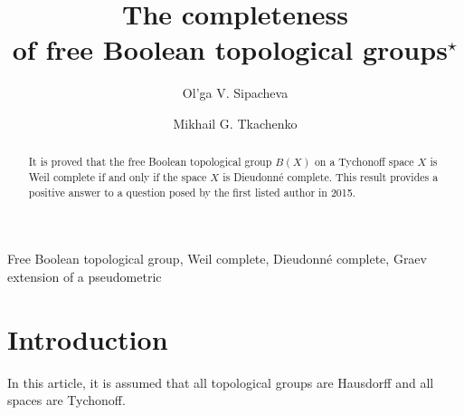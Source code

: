 \documentclass[a4paper,12pt]{amsart}
\theoremstyle{definition}
\begin{document}
{

\renewcommand*{\thefootnote}{$\star$}

\title{The completeness\\ of free Boolean topological groups$^\star$}

}

\author{Ol'ga V. Sipacheva}


\address{Department of General Topology and Geometry, Faculty of Mechanics
and Mathematics, M. V. Lomonosov Moscow State University, Leninskie Gory 1, 
Moscow, 199991 Russia}

\author{Mikhail G. Tkachenko}


\address{Department of Mathematics, Universidad Aut\'onoma Metropolitana, 
Av. San Rafael Atlixco 186, Col. Vicentina, Iztapalapa, C.P. 09340, 
Mexico City, Mexico}


\begin{abstract}
It is proved that the free Boolean topological group $B(X)$ on a
Tychonoff space $X$ is Weil complete if and only if the space $X$ 
is Dieudonn\'e complete. This result provides a positive answer 
to a question posed by the first listed author in 2015. 
\end{abstract}

\keywords
{Free Boolean topological group, 
Weil complete, Dieudonn\'e complete, Graev extension of a pseudometric}


 \maketitle

\section{Introduction}
In this article, it is assumed that all topological groups are Hausdorff 
and all spaces are Tychonoff. 
\end{document}
